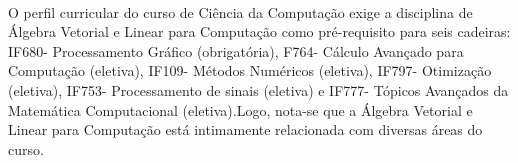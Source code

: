 \documentclass[14pt, a4paper]{article}
\begin{document}
\paragraph{}

O perfil curricular do curso de Ciência da Computação exige a disciplina de 
Álgebra Vetorial e Linear para Computação como pré-requisito para seis cadeiras: IF680- Processamento Gráfico (obrigatória), F764- Cálculo Avançado para Computação (eletiva), IF109- Métodos Numéricos (eletiva), IF797- Otimização (eletiva), IF753- Processamento de sinais (eletiva) e IF777- Tópicos Avançados da Matemática Computacional (eletiva).Logo, nota-se que a Álgebra Vetorial e Linear para Computação está intimamente relacionada com diversas áreas do curso. \citep{Perfil}



\end{document}
